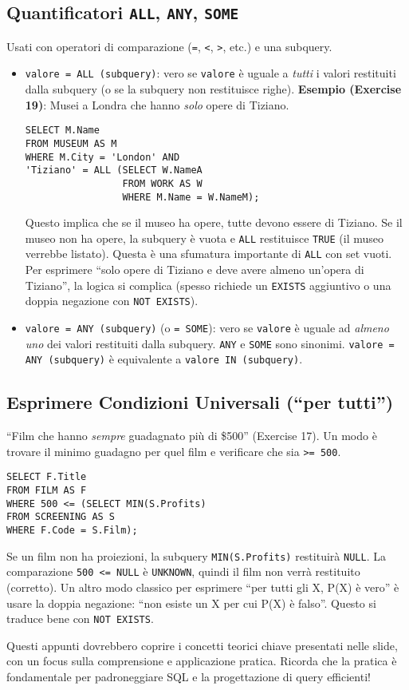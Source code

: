 \subsection{Quantificatori \texttt{ALL}, \texttt{ANY}, \texttt{SOME}}
Usati con operatori di comparazione (\texttt{=}, \texttt{<}, \texttt{>}, etc.) e una subquery.
\begin{itemize}
    \item \texttt{valore = ALL (subquery)}: vero se \texttt{valore} è uguale a \textit{tutti} i valori restituiti dalla subquery (o se la subquery non restituisce righe).
    \textbf{Esempio (Exercise 19)}: Musei a Londra che hanno \textit{solo} opere di Tiziano.
    \begin{verbatim}
SELECT M.Name
FROM MUSEUM AS M
WHERE M.City = 'London' AND
'Tiziano' = ALL (SELECT W.NameA
                 FROM WORK AS W
                 WHERE M.Name = W.NameM);
    \end{verbatim}
    Questo implica che se il museo ha opere, tutte devono essere di Tiziano. Se il museo non ha opere, la subquery è vuota e \texttt{ALL} restituisce \texttt{TRUE} (il museo verrebbe listato). Questa è una sfumatura importante di \texttt{ALL} con set vuoti. Per esprimere ``solo opere di Tiziano e deve avere almeno un'opera di Tiziano'', la logica si complica (spesso richiede un \texttt{EXISTS} aggiuntivo o una doppia negazione con \texttt{NOT EXISTS}).

    \item \texttt{valore = ANY (subquery)} (o \texttt{= SOME}): vero se \texttt{valore} è uguale ad \textit{almeno uno} dei valori restituiti dalla subquery. \texttt{ANY} e \texttt{SOME} sono sinonimi. \texttt{valore = ANY (subquery)} è equivalente a \texttt{valore IN (subquery)}.
\end{itemize}

\subsection{Esprimere Condizioni Universali (``per tutti'')}
``Film che hanno \textit{sempre} guadagnato più di \$500'' (Exercise 17).
Un modo è trovare il minimo guadagno per quel film e verificare che sia \texttt{>= 500}.
\begin{verbatim}
SELECT F.Title
FROM FILM AS F
WHERE 500 <= (SELECT MIN(S.Profits)
FROM SCREENING AS S
WHERE F.Code = S.Film);
\end{verbatim}
Se un film non ha proiezioni, la subquery \texttt{MIN(S.Profits)} restituirà \texttt{NULL}. La comparazione \texttt{500 <= NULL} è \texttt{UNKNOWN}, quindi il film non verrà restituito (corretto).
Un altro modo classico per esprimere ``per tutti gli X, P(X) è vero'' è usare la doppia negazione: ``non esiste un X per cui P(X) è falso''. Questo si traduce bene con \texttt{NOT EXISTS}.

\vspace{1cm}
Questi appunti dovrebbero coprire i concetti teorici chiave presentati nelle slide, con un focus sulla comprensione e applicazione pratica. Ricorda che la pratica è fondamentale per padroneggiare SQL e la progettazione di query efficienti!

